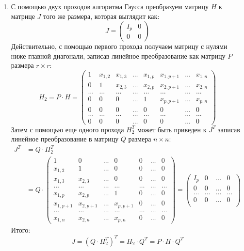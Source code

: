  \begin{enumerate}
 	\item С помощью двух проходов алгоритма Гаусса преобразуем матрицу $H$ к матрице $J$ того же размера,
 	 которая выглядит как:
 	\[
 		J = \begin{pmatrix}
 			I_p & 0 \\
 			0 & 0
 		\end{pmatrix}
 	\] 
 	Действительно, с помощью первого прохода получаем матрицу с нулями ниже главной диагонали,
 	 записав линейное преобразование как матрицу $P$ размера $r \times r$:
 	\[
 		H_2 = P \cdot H = \begin{pmatrix}
 			1 & x_{1,2} & x_{1,3} & \ldots & x_{1,p} & x_{1,p+1} & \ldots & x_{1,n} \\
 			0 & 1 & x_{2,3} & \ldots & x_{2,p} & x_{2,p+1} & \ldots & x_{2,n} \\
 			\ldots & \ldots & \ldots & \ldots & \ldots & \ldots & \ldots & \ldots \\
 			0 & 0 & 0 & \ldots & 1 & x_{p,p+1} & \ldots & x_{p,n} \\ 
 			0 & 0 & 0 & \ldots & 0 & 0 & \ldots & 0 \\ 
 			\ldots & \ldots & \ldots & \ldots & \ldots & \ldots & \ldots & \ldots \\
 			0 & 0 & 0 & \ldots & 0 & 0 & \ldots & 0
 		\end{pmatrix}
 	\]
 	Затем с помощью еще одного прохода $H_2^T$ может быть приведен к $J^T$ записав линейное преобразование
 	в матрицу $Q$ размера $n \times n$:
 	\[
 	\begin{split}
 		J^T & = Q \cdot H_2^T \\
 		& = Q \cdot \begin{pmatrix}
 			1 & 0 & \ldots & 0 & 0 & \ldots & 0 \\
 			x_{1,2} & 1 & \ldots & 0 & 0 & \ldots & 0 \\
 			x_{1,3} & x_{2,3} & \ldots & 0 & 0 & \ldots & 0 \\
 			\ldots & \ldots & \ldots & \ldots & \ldots & \ldots & \ldots \\
 			x_{1,p} & x_{2,p} & \ldots & 1 & 0 & \ldots & 0 \\
 			x_{1,p+1} & x_{2,p+1} & \ldots & x_{p,p+1} & 0 & \ldots & 0 \\
 			\ldots & \ldots & \ldots & \ldots & \ldots & \ldots & \ldots \\
 			x_{1,n} & x_{2,n} & \ldots & x_{p,n} & 0 & \ldots & 0
 		\end{pmatrix}  = \begin{pmatrix}
 			I_p & 0 & \ldots & 0 \\
 			0 & 0 & \ldots & 0 \\
 			\ldots & \ldots & \ldots & \ldots \\
 			0 & 0 & \ldots & 0 \\
 		\end{pmatrix}
 	\end{split}
 	\]
 	Итого:
 	\[
 		J = (Q \cdot H_2^T)^T = H_2 \cdot Q^T = P \cdot H \cdot Q^T
 	\]
 	

\end{enumerate}
